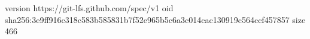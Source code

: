 version https://git-lfs.github.com/spec/v1
oid sha256:3e9ff916c318c583b585831b7f52e965b5c6a3c014cac130919c564ccf457857
size 466

